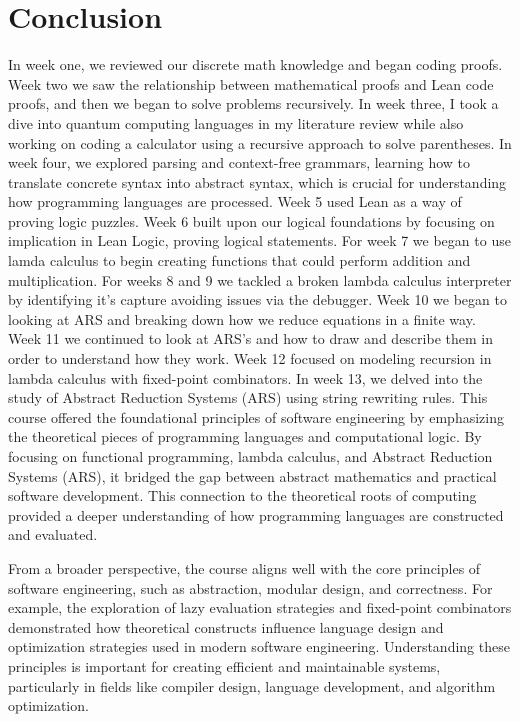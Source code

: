 \documentclass{article}
\begin{document}
\section*{Conclusion}
In week one, we reviewed our discrete math knowledge and began coding proofs. Week two we saw the relationship between mathematical proofs and Lean code proofs, and then we began to solve problems recursively. In week three, I took a dive into quantum computing languages in my literature review while also working on coding a calculator using a recursive approach to solve parentheses. In week four, we explored parsing and context-free grammars, learning how to translate concrete syntax into abstract syntax, which is crucial for understanding how programming languages are processed. Week 5 used Lean as a way of proving logic puzzles. Week 6 built upon our logical foundations by focusing on implication in Lean Logic, proving logical statements. For week 7 we began to use lamda calculus to begin creating functions that could perform addition and multiplication. For weeks 8 and 9 we tackled a broken lambda calculus interpreter by identifying it's capture avoiding issues via the debugger. Week 10 we began to looking at ARS and breaking down how we reduce equations in a finite way. Week 11 we continued to look at ARS's and how to draw and describe them in order to understand how they work. Week 12 focused on modeling recursion in lambda calculus with fixed-point combinators. In week 13, we delved into the study of Abstract Reduction Systems (ARS) using string rewriting rules.
This course offered the foundational principles of software engineering by emphasizing the theoretical pieces of programming languages and computational logic. By focusing on functional programming, lambda calculus, and Abstract Reduction Systems (ARS), it bridged the gap between abstract mathematics and practical software development. This connection to the theoretical roots of computing provided a deeper understanding of how programming languages are constructed and evaluated.

From a broader perspective, the course aligns well with the core principles of software engineering, such as abstraction, modular design, and correctness. For example, the exploration of lazy evaluation strategies and fixed-point combinators demonstrated how theoretical constructs influence language design and optimization strategies used in modern software engineering. Understanding these principles is important for creating efficient and maintainable systems, particularly in fields like compiler design, language development, and algorithm optimization.
\end{document}
